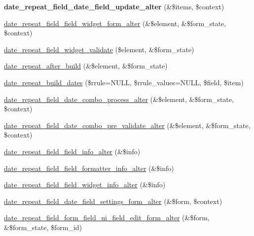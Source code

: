 \begin{DoxyCompactItemize}
\item 
\hypertarget{date__repeat__field_8module_ae53df913c3ea220e3735a743272d745a}{
{\bfseries date\_\-repeat\_\-field\_\-date\_\-field\_\-update\_\-alter} (\&\$items, \$context)}
\label{date__repeat__field_8module_ae53df913c3ea220e3735a743272d745a}

\item 
\hyperlink{date__repeat__field_8module_a5914caf7a2db79c7439116ac08fc9637}{date\_\-repeat\_\-field\_\-field\_\-widget\_\-form\_\-alter} (\&\$element, \&\$form\_\-state, \$context)
\item 
\hyperlink{date__repeat__field_8module_aa1797d26d6677578e187b06636d0f9a0}{date\_\-repeat\_\-field\_\-widget\_\-validate} (\$element, \&\$form\_\-state)
\item 
\hyperlink{date__repeat__field_8module_ab99b7df43b4a1e9f1078af6a37729437}{date\_\-repeat\_\-after\_\-build} (\&\$element, \&\$form\_\-state)
\item 
\hyperlink{date__repeat__field_8module_a749f692c4fa9c346f1760a10f3ae96ed}{date\_\-repeat\_\-build\_\-dates} (\$rrule=NULL, \$rrule\_\-values=NULL, \$field, \$item)
\item 
\hyperlink{date__repeat__field_8module_a534e8b80a23eabf8f5cc19a22f3cf4df}{date\_\-repeat\_\-field\_\-date\_\-combo\_\-process\_\-alter} (\&\$element, \&\$form\_\-state, \$context)
\item 
\hyperlink{date__repeat__field_8module_a288466bfc9261d718cdfc0bcfa1d0504}{date\_\-repeat\_\-field\_\-date\_\-combo\_\-pre\_\-validate\_\-alter} (\&\$element, \&\$form\_\-state, \$context)
\item 
\hyperlink{date__repeat__field_8module_ad5c963b8f4121e98d8f418fa7d0ae567}{date\_\-repeat\_\-field\_\-field\_\-info\_\-alter} (\&\$info)
\item 
\hyperlink{date__repeat__field_8module_a38a52391b8d04182e8525017a79b6c5e}{date\_\-repeat\_\-field\_\-field\_\-formatter\_\-info\_\-alter} (\&\$info)
\item 
\hyperlink{date__repeat__field_8module_a234852fc42f6e6c0e7483ffcdbcbf958}{date\_\-repeat\_\-field\_\-field\_\-widget\_\-info\_\-alter} (\&\$info)
\item 
\hyperlink{date__repeat__field_8module_ae99ea1ff99e33265096ccf6f1a2fe1f9}{date\_\-repeat\_\-field\_\-date\_\-field\_\-settings\_\-form\_\-alter} (\&\$form, \$context)
\item 
\hyperlink{date__repeat__field_8module_ac32396f6f544c90c240d4bd40e908124}{date\_\-repeat\_\-field\_\-form\_\-field\_\-ui\_\-field\_\-edit\_\-form\_\-alter} (\&\$form, \&\$form\_\-state, \$form\_\-id)

\end{DoxyCompactItemize}
